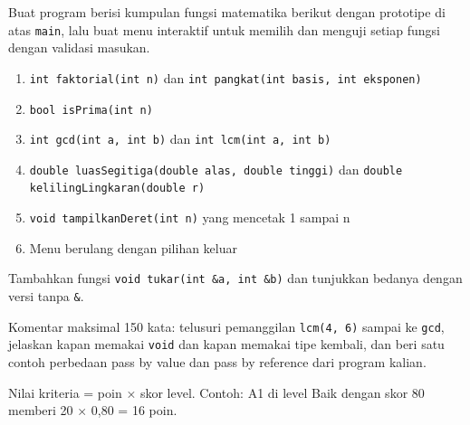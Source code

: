 \documentclass[a4paper]{article}
\begin{document}
Buat program berisi kumpulan fungsi matematika berikut dengan prototipe di atas \texttt{main}, lalu buat menu interaktif untuk memilih dan menguji setiap fungsi dengan validasi masukan.
\begin{enumerate}
\item \texttt{int faktorial(int n)} dan \texttt{int pangkat(int basis, int eksponen)}
\item \texttt{bool isPrima(int n)}
\item \texttt{int gcd(int a, int b)} dan \texttt{int lcm(int a, int b)}
\item \texttt{double luasSegitiga(double alas, double tinggi)} dan \texttt{double kelilingLingkaran(double r)}
\item \texttt{void tampilkanDeret(int n)} yang mencetak 1 sampai n
\item Menu berulang dengan pilihan keluar
\end{enumerate}
\begin{Contoh}
Tambahkan fungsi \texttt{void tukar(int \&a, int \&b)} dan tunjukkan bedanya dengan versi tanpa \texttt{\&}.
\end{Contoh}
Komentar maksimal 150 kata: telusuri pemanggilan \texttt{lcm(4, 6)} sampai ke \texttt{gcd}, jelaskan kapan memakai \texttt{void} dan kapan memakai tipe kembali, dan beri satu contoh perbedaan pass by value dan pass by reference dari program kalian.

\par\vspace{4pt}\par\vspace{6pt}
Nilai kriteria = poin × skor level. Contoh: A1 di level Baik dengan skor 80 memberi 20 × 0,80 = 16 poin.
\end{document}
